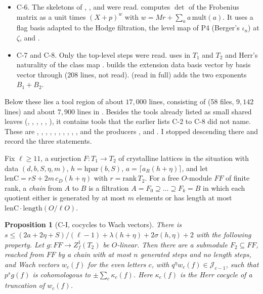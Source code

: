 \documentclass[11pt]{article}
\newtheorem{prop}[lemma]{Proposition}
\theoremstyle{definition}
\theoremstyle{remark}
\begin{document}
\begin{itemize}[leftmargin=*,itemsep=1pt]
\item C-6. The skeletons of , ,  and  were read.  computes $\det$ of the Frobenius matrix as a unit times $(X+p)^w$ with $w=Mr+\sum_aa\,\mathrm{mult}(a)$. It uses a flag basis adapted to the Hodge filtration, the level map of P4 (Berger's $\iota_n$) at $\zeta$, and .
\item C-7 and C-8. Only the top-level steps were read.  uses  in $T_1$ and $T_2$ and Herr's naturality of the class map .  builds the extension data basis vector by basis vector through  (208 lines, not read).  (read in full) adds the two exponents $B_1+B_2$.
\end{itemize}

Below these lies a tool region of about $17{,}000$ lines, consisting of  (58 files, $9{,}142$ lines) and about $7{,}900$ lines in . Besides the tools already listed as small shared leaves (, , , , , ), it contains tools that the earlier lists C-2 to C-8 did not name. These are , , , , , , , , , , and the producers ,  and . I stopped descending there and record the three statements.

Fix $\ell\ge11$, a surjection $F\colon T_1\to T_2$ of crystalline lattices in the situation  with data $(d,b,S,\eta,m)$, $h=\mathrm{hpar}(b,S)$, $a=\lceil a_R(h+\eta)\rceil$, and let $\mathrm{lenC}=rS+2m\,c_D(h+\eta)$ with $r=\mathrm{rank}\,T_2$. For a free $O$-module $FF$ of finite rank, a \emph{chain} from $A$ to $B$ is a filtration $A=F_0\supseteq\dots\supseteq F_k=B$ in which each quotient either is generated by at most $m$ elements or has length at most $\mathrm{lenC}\cdot\mathrm{length}(O/\ell O)$.

\begin{prop}[C-I, cocycles to Wach vectors]\label{prop:CI}
There is $s\le(2a+2\eta+S)/(\ell-1)+\lambda(h+\eta)+2\sigma(h,\eta)+2$ with the following property. Let $g\colon FF\to Z^1_{f}(T_2)$ be $O$-linear. Then there are a submodule $F_2\subseteq FF$, reached from $FF$ by a chain with at most $n$ generated steps and no length steps, and Wach vectors $w_c(f)$ for the even letters $c$, with $q^\eta w_c(f)\in\mathcal J_{c-1}$, such that $p^sg(f)$ is cohomologous to $\pm\sum_c\kappa_c(f)$. Here $\kappa_c(f)$ is the Herr cocycle of a truncation of $w_c(f)$.
\end{prop}
\end{document}
